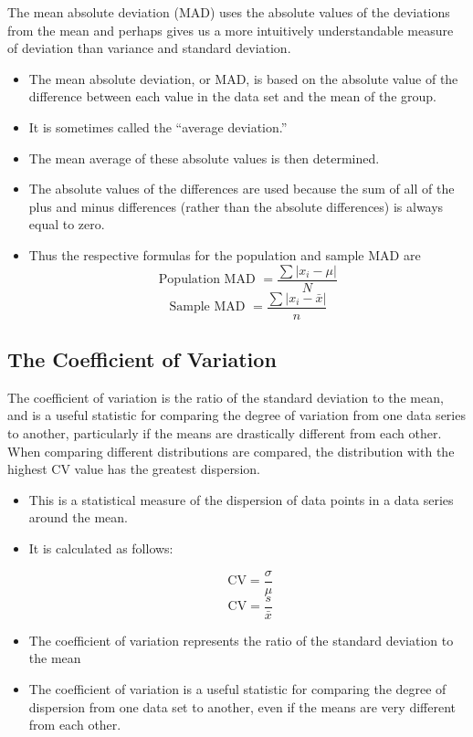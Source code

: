 \documentclass[]{report}
\begin{document}
	The mean absolute deviation (MAD) uses the absolute values of the deviations from
	the mean and perhaps gives us a more intuitively understandable measure of deviation than
	variance and standard deviation.
	
	
	\begin{itemize}
		\item The mean absolute deviation, or MAD, is based on the absolute value of the difference between each value
		in the data set and the mean of the group. 
		\item It is sometimes called the “average deviation.” 
		\item The mean average of
		these absolute values is then determined. 
		\item The absolute values of the differences are used because the sum of all
		of the plus and minus differences (rather than the absolute differences) is always equal to zero. 
		\item Thus the
		respective formulas for the population and sample MAD are
		\[ \mbox{Population MAD }= \frac{\sum |x_i - \mu|}{N} \]
		\[ \mbox{Sample MAD }= \frac{\sum |x_i - \bar{x}|}{n} \]
	\end{itemize}
	
	
	
	
	
	
	
	
	
	
	
	
	
\subsection{The Coefficient of Variation}

The coefficient of variation is the ratio of the standard deviation to the mean, and is a useful statistic for comparing the degree of variation from one data series to another, particularly  if the means are drastically different from each other. \\\bigskip When comparing different distributions are compared, the distribution with the highest CV value has the greatest dispersion.




\begin{itemize}
	\item This is a statistical measure of the dispersion of data points in a data series around the mean. 
	\item It is calculated as follows:
	
	\[  \mbox{ CV}  = \frac{\sigma}{\mu}  \]
	\[  \mbox{ CV}  = \frac{s}{\bar{x}}  \]
	
	\item The coefficient of variation represents the ratio of the standard deviation to the mean
	
	\item The coefficient of variation is a useful statistic for comparing the degree of dispersion from one data set
	to another, even if the means are very different from each other.
\end{itemize}
\end{document}
